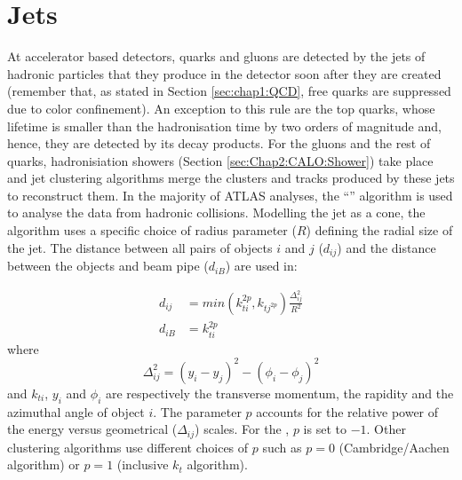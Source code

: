 


\section{Jets}
\label{sec:Chap3:Reco:jets}
At accelerator based detectors, quarks and gluons are detected by the jets of hadronic particles that they produce
in the detector soon after they are created (remember that, as stated in Section \ref{sec:chap1:QCD}, free quarks
are suppressed due to color confinement).
An exception to this rule are the top quarks, whose lifetime is smaller than the hadronisation time by two orders of
magnitude and, hence, they are detected by its decay products. 
For the gluons and the rest of quarks, hadronisiation showers (Section \ref{sec:Chap2:CALO:Shower}) 
take place and jet clustering algorithms merge the clusters and tracks produced by these jets
to reconstruct them.
In the majority of ATLAS analyses, the ``\Akt'' algorithm is used \cite{Cacciari:2008gp} to analyse the data
from hadronic collisions. Modelling the jet as a cone, the algorithm uses a specific choice of radius parameter 
($R$) defining the radial size of the jet. 
The distance between all pairs of objects $i$ and $j$ ($d_{ij}$) and the distance between the 
objects and beam pipe ($d_{iB}$) are used in: 

\begin{align*}
	d_{ij} 	&= min(k^{2p}_{ti}, k_{tj^{2p}}) \frac{\Delta_{ij}^{2}}{R^{2}} \\ \label{eq:chap3:antikt_1}
	d_{iB} 	&= k^{2p}_{ti}
\end{align*}
where
\begin{equation*}
	\Delta_{ij}^{2} = (y_{i} - y_{j})^{2} - (\phi_{i} - \phi_{j})^2
\end{equation*}
and $k_{ti}$, $y_i$ and $\phi_{i}$ are respectively the transverse momentum, the rapidity and
the azimuthal angle of object $i$. The parameter $p$ accounts for the relative power of the energy 
versus geometrical ($\Delta_{ij}$) scales. For the \Akt, $p$ is set to $-1$. Other clustering algorithms
use different choices of $p$ such as $p=0$ (Cambridge/Aachen algorithm) or $p=1$ (inclusive $k_t$ 
algorithm). 


